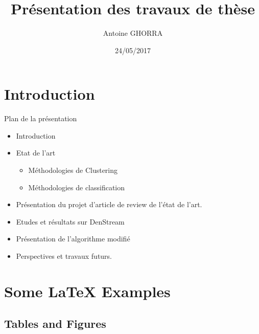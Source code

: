 \documentclass{beamer}
\title[Your Short Title]{Présentation des travaux de thèse}
\author{Antoine GHORRA}
\institute{Département informatique et automatique- Institut Mines Telecom}
\date{24/05/2017}
\begin{document}
\begin{frame}
  \titlepage
\end{frame}


\section{Introduction}

\begin{frame}{Plan de la présentation}

\begin{itemize}
  \item Introduction
  \item Etat de l'art
  \begin{itemize}
  	\item Méthodologies de Clustering
  	\item Méthodologies de classification
  \end{itemize} 
  \item Présentation du projet d'article de review de l'état de l'art.
  \item Etudes et résultats sur DenStream
  \item Présentation de l'algorithme modifié
  \item Perspectives et travaux futurs.
\end{itemize}

\vskip 1cm

\end{frame}

\section{Some \LaTeX{} Examples}

\subsection{Tables and Figures}
\end{document}
